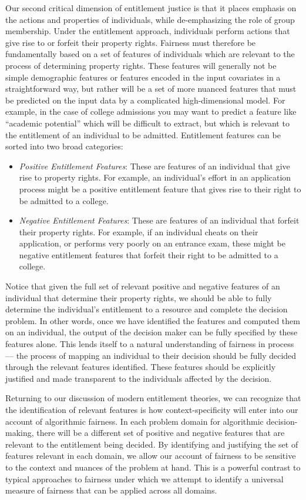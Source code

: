 Our second critical dimension of entitlement justice is that it places
emphasis on the actions and properties of individuals, while de-emphasizing
the role of group membership. Under the entitlement approach, individuals
perform actions that give rise to or forfeit their property rights. Fairness
must therefore be fundamentally based on a set of features of individuals which
are relevant to the process of determining property rights. These features will
generally not be simple demographic features or features encoded in the input
covariates in a straightforward way, but rather will be a set of more nuanced
features that must be predicted on the input data by a complicated
high-dimensional model. For example, in the case of college admissions you may
want to predict a feature like ``academic potential'' which will be difficult to
extract, but which is relevant to the entitlement of an individual to be
admitted. Entitlement features can be sorted into two broad categories:
\begin{itemize}
    \item \emph{Positive Entitlement Features}: These are features of an
    individual that give rise to property rights. For example, an
    individual's effort in an application process might be a positive
    entitlement feature that gives rise to their right to be admitted
    to a college.
    \item \emph{Negative Entitlement Features}: These are features of an
    individual that forfeit their property rights. For example, if
    an individual cheats on their application, or performs very poorly on an
    entrance exam, these might be negative entitlement features that
    forfeit their right to be admitted to a college. 
\end{itemize}
Notice that given the full set of relevant positive and negative features of an
individual that determine their property rights, we should be able to fully
determine the individual's entitlement to a resource and complete the decision
problem. In other words, once we have identified the features and computed
them on an individual, the output of the decision maker can be fully specified
by these features alone. This lends itself to a natural understanding of
fairness in process — the process of mapping an individual to their decision
should be fully decided through the relevant features identified. These
features should be explicitly justified and made transparent to the
individuals affected by the decision. 

Returning to our discussion of modern entitlement theories, we can recognize
that the identification of relevant features is how context-specificity will
enter into our account of algorithmic fairness. In each problem domain for 
algorithmic decision-making, there will be a different set of positive and
negative features that are relevant to the entitlement being decided. By
identifying and justifying the set of features relevant in each domain, we
allow our account of fairness to be sensitive to the context and nuances of the
problem at hand. This is a powerful contrast to typical approaches to fairness
under which we attempt to identify a universal measure of fairness that can be
applied across all domains.


